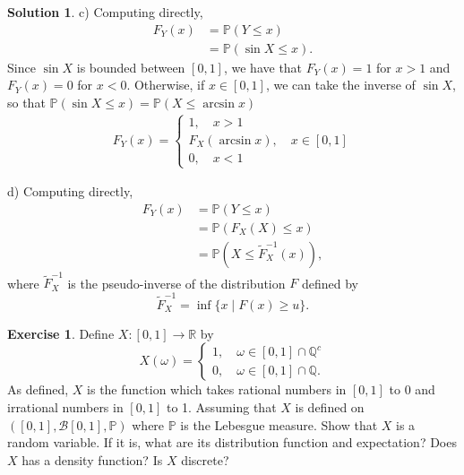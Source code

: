 \documentclass[12pt]{article}
\newcommand{\bbQ}{\mathbb{Q}}
\newcommand{\bbR}{\mathbb{R}}
\newcommand{\Prob}{\mathbb{P}}
\theoremstyle{definition}
\newtheorem{exer}{Exercise}
\newtheorem{sol}{Solution}
\theoremstyle{remark}
\begin{document}
\begin{sol}
c) Computing directly,
\begin{align}
    F_Y(x) &= \Prob(Y \leq x) \\
           &= \Prob(\sin X \leq x).
\end{align}
Since $\sin X$ is bounded between $[0,1]$, we have that $F_Y(x) = 1$ for $x>1$ and $F_Y(x) = 0$ for $x<0$. Otherwise, if $x\in[0,1]$, we can take the inverse of $\sin X$, so that $\Prob(\sin X \leq x) = \Prob(X \leq \arcsin x)$
\begin{align}
    F_Y(x) = \begin{cases}
        1, \quad x > 1\\
        F_X(\arcsin x), \quad x\in [0,1]\\
        0, \quad x < 1
    \end{cases}
\end{align}

d) Computing directly, 
\begin{align}
    F_Y(x) &= \Prob(Y \leq x) \\
           &= \Prob( F_X(X) \leq x ) \\ 
           &= \Prob( X\leq \tilde{F}_X^{-1}(x)),
\end{align}
where $\tilde{F}_X^{-1}$ is the pseudo-inverse of the distribution $F$ defined by
\begin{equation}
    \tilde{F}_X^{-1} = \inf \{x \mid F(x)\geq u  \}.
\end{equation}
\end{sol}

\newpage

\begin{exer}
    Define $X\colon [0,1]\to \bbR$ by 
    \begin{equation}
        X(\omega) = \begin{cases}
            1, \quad \omega \in [0,1]\cap\bbQ^c\\
            0, \quad \omega \in [0,1]\cap\bbQ.
        \end{cases}
    \end{equation}
    As defined, $X$ is the function which takes rational numbers in $[0,1]$ to 0 and irrational numbers in $[0,1]$ to 1. Assuming that $X$ is defined on $([0,1], \mathcal{B}[0,1], \Prob)$ where $\Prob$ is the Lebesgue measure. Show that $X$ is a random variable. If it is, what are its distribution function and expectation? Does $X$ has a density function? Is $X$ discrete?
\end{exer}
\end{document}
